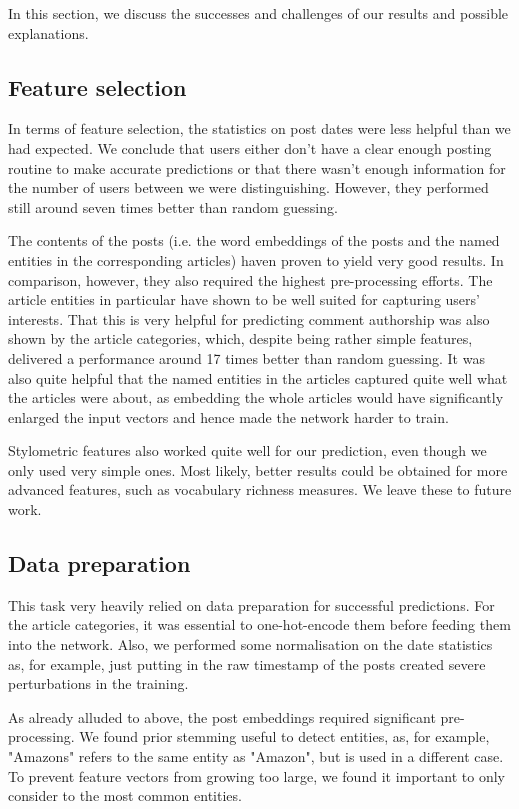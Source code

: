 \documentclass[acmsmall]{acmart}
\begin{document}
In this section, we discuss the successes and challenges of our results and possible explanations.

\subsection{Feature selection}

In terms of feature selection, the statistics on post dates were less helpful than we had expected. We conclude that users either don't have a clear enough posting routine to make accurate predictions or that there wasn't enough information for the number of users between we were distinguishing. However, they performed still around seven times better than random guessing. 

The contents of the posts (i.e. the word embeddings of the posts and the named entities in the corresponding articles) haven proven to yield very good results. In comparison, however, they also required the highest pre-processing efforts. The article entities in particular have shown to be well suited for capturing users' interests. That this is very helpful for predicting comment authorship was also shown by the article categories, which, despite being rather simple features, delivered a performance around 17 times better than random guessing. It was also quite helpful that the named entities in the articles captured quite well what the articles were about, as embedding the whole articles would have significantly enlarged the input vectors and hence made the network harder to train.

Stylometric features also worked quite well for our prediction, even though we only used very simple ones. Most likely, better results could be obtained for more advanced features, such as vocabulary richness measures. We leave these to future work.

\subsection{Data preparation}

This task very heavily relied on data preparation for successful predictions. For the article categories, it was essential to one-hot-encode them before feeding them into the network. Also, we performed some normalisation on the date statistics as, for example, just putting in the raw timestamp of the posts created severe perturbations in the training.

As already alluded to above, the post embeddings required significant pre-processing. We found prior stemming useful to detect entities, as, for example, "Amazons" refers to the same entity as "Amazon", but is used in a different case. To prevent feature vectors from growing too large, we found it important to only consider to the most common entities. 
\end{document}
